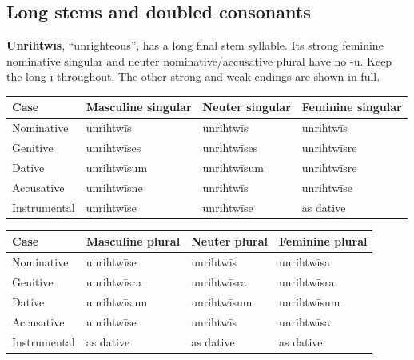\subsection*{Long stems and doubled consonants}

\textbf{Unrihtwīs}, “unrighteous”, has a long final stem syllable. Its strong feminine nominative singular and neuter nominative/\allowbreak{}accusative plural have no -u. Keep the long ī throughout. The other strong and weak endings are shown in full.

\par\begingroup
\fontsize{10.5}{13.2}\selectfont
\setlength{\LTleft}{0pt}\setlength{\LTright}{\fill}
\noindent
\begin{tabular}{@{}>{\raggedright\arraybackslash}p{22.0mm}>{\raggedright\arraybackslash}p{31.188mm}>{\raggedright\arraybackslash}p{31.188mm}>{\raggedright\arraybackslash}p{31.188mm}@{}}
\toprule
\textbf{Case} & \textbf{Masculine singular} & \textbf{Neuter singular} & \textbf{Feminine singular} \\
\midrule
Nominative & unrihtwīs & unrihtwīs & unrihtwīs \\
Genitive & unrihtwīses & unrihtwīses & unrihtwīsre \\
Dative & unrihtwīsum & unrihtwīsum & unrihtwīsre \\
Accusative & unrihtwīsne & unrihtwīs & unrihtwīse \\
Instrumental & unrihtwīse & unrihtwīse & as dative \\
\bottomrule
\end{tabular}
\par\endgroup
\par\addvspace{5pt}
\par\begingroup
\fontsize{10.5}{13.2}\selectfont
\setlength{\LTleft}{0pt}\setlength{\LTright}{\fill}
\noindent
\begin{tabular}{@{}>{\raggedright\arraybackslash}p{22.0mm}>{\raggedright\arraybackslash}p{31.188mm}>{\raggedright\arraybackslash}p{31.188mm}>{\raggedright\arraybackslash}p{31.188mm}@{}}
\toprule
\textbf{Case} & \textbf{Masculine plural} & \textbf{Neuter plural} & \textbf{Feminine plural} \\
\midrule
Nominative & unrihtwīse & unrihtwīs & unrihtwīsa \\
Genitive & unrihtwīsra & unrihtwīsra & unrihtwīsra \\
Dative & unrihtwīsum & unrihtwīsum & unrihtwīsum \\
Accusative & unrihtwīse & unrihtwīs & unrihtwīsa \\
Instrumental & as dative & as dative & as dative \\
\bottomrule
\end{tabular}
\par\endgroup

